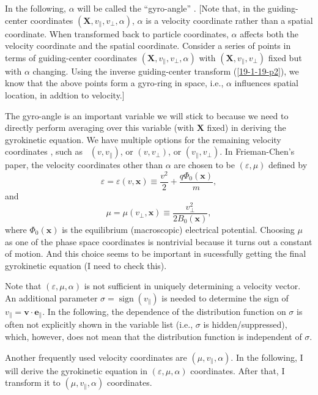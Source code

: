 \documentclass{article}
\newcommand{\tmop}[1]{\ensuremath{\operatorname{#1}}}
\begin{document}
In the following, $\alpha$ will be called the ``gyro-angle'' . [Note that, in
the guiding-center coordinates $(\mathbf{X}, v_{\parallel}, v_{\perp},
\alpha)$, $\alpha$ is a velocity coordinate rather than a spatial coordinate.
When transformed back to particle coordinates, $\alpha$ affects both the
velocity coordinate and the spatial coordinate. Consider a series of points in
terms of guiding-center coordinates $(\mathbf{X}, v_{\parallel}, v_{\perp},
\alpha)$ with $(\mathbf{X}, v_{\parallel}, v_{\perp})$ fixed but with $\alpha$
changing. Using the inverse guiding-center transform (\ref{19-1-19-p2}), we
know that the above points form a gyro-ring in space, i.e., $\alpha$
influences spatial location, in addtion to velocity.]

The gyro-angle is an important variable we will stick to because we need to
directly perform averaging over this variable (with $\mathbf{X}$ fixed) in
deriving the gyrokinetic equation. We have multiple options for the remaining
velocity coordinates , such as \ $(v, v_{\parallel})$, or $(v, v_{\perp})$, or
$(v_{\parallel}, v_{\perp})$. In Frieman-Chen's paper, the velocity
coordinates other than $\alpha$ are chosen to be $(\varepsilon, \mu)$ defined
by
\begin{equation}
  \varepsilon = \varepsilon (v, \mathbf{x}) \equiv \frac{v^2}{2} + \frac{q
  \Phi_0 (\mathbf{x})}{m},
\end{equation}
and
\begin{equation}
  \mu = \mu (v_{\perp}, \mathbf{x}) \equiv \frac{v_{\perp}^2}{2 B_0
  (\mathbf{x})},
\end{equation}
where $\Phi_0 (\mathbf{x})$ is the equilibrium (macroscopic) electrical
potential. Choosing $\mu$ as one of the phase space coordinates is nontrivial
because it turns out a constant of motion. And this choice seems to be
important in sucessfully getting the final gyrokinetic equation (I need to
check this).

Note that $(\varepsilon, \mu, \alpha)$ is not sufficient in uniquely
determining a velocity vector. An additional parameter $\sigma = \tmop{sign}
(v_{\parallel})$ is needed to determine the sign of $v_{\parallel} =\mathbf{v}
\cdot \mathbf{e}_{\parallel}$. In the following, the dependence of the
distribution function on $\sigma$ is often not explicitly shown in the
variable list (i.e., $\sigma$ is hidden/suppressed), which, however, does not
mean that the distribution function is independent of $\sigma$.

Another frequently used velocity coordinates are $(\mu, v_{\parallel},
\alpha)$. In the following, I will derive the gyrokinetic equation in
$(\varepsilon, \mu, \alpha)$ coordinates. After that, I transform it to $(\mu,
v_{\parallel}, \alpha)$ coordinates.
\end{document}
